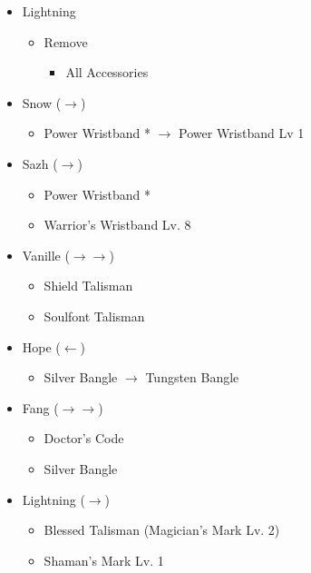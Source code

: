 \begin{multicols}{2}
\begin{menu}
\begin{itemize}
    \equip
    \begin{itemize}
        \item Lightning
        \begin{itemize}
            \item Remove
            \begin{itemize}
                \item All Accessories
            \end{itemize}
        \end{itemize}
        \item Snow ($\rightarrow$)
            \begin{itemize}
                \item Power Wristband * $\rightarrow$ Power Wristband Lv 1
            \end{itemize}
        \item Sazh ($\rightarrow$)
        \begin{itemize}
                \item Power Wristband *
                \item Warrior's Wristband Lv. 8
            \end{itemize}
        
        \item Vanille ($\rightarrow\rightarrow$)
        \begin{itemize}
                \item Shield Talisman
                \item Soulfont Talisman
        \end{itemize}
        \item Hope ($\leftarrow$)
            \begin{itemize}
                \item Silver Bangle $\rightarrow$ Tungsten Bangle
            \end{itemize}
        \item Fang ($\rightarrow\rightarrow$)
            \begin{itemize}
                \item Doctor's Code
                \item Silver Bangle
        \end{itemize}
        \item Lightning ($\rightarrow$)
        \begin{itemize}
                \item Blessed Talisman (Magician's Mark Lv. 2)
                \item Shaman's Mark Lv. 1
        \end{itemize}
    \end{itemize}
\end{itemize}


\end{menu}
\end{multicols}

